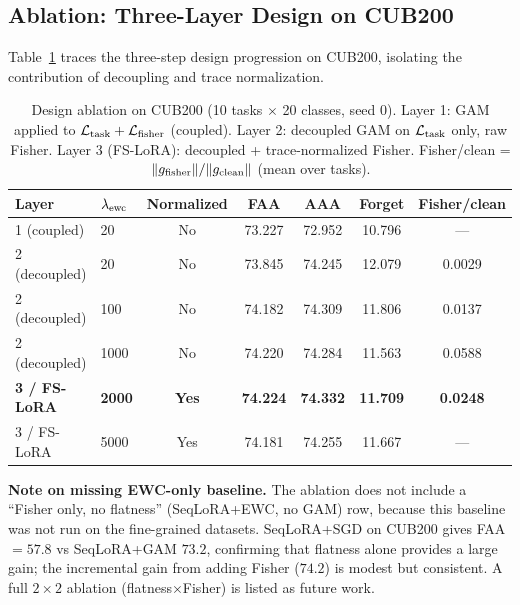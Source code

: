 \subsection{Ablation: Three-Layer Design on CUB200}
\label{sec:ablation}

Table~\ref{tab:ablation} traces the three-step design progression on CUB200,
isolating the contribution of decoupling and trace normalization.

\begin{table}[h]
\caption{Design ablation on CUB200 (10 tasks $\times$ 20 classes, seed 0).
Layer 1: GAM applied to $\mathcal{L}_{\mathrm{task}}+\mathcal{L}_{\mathrm{fisher}}$ (coupled).
Layer 2: decoupled GAM on $\mathcal{L}_{\mathrm{task}}$ only, raw Fisher.
Layer 3 (FS-LoRA): decoupled + trace-normalized Fisher.
Fisher/clean = $\|g_{\mathrm{fisher}}\|/\|g_{\mathrm{clean}}\|$ (mean over tasks).}
\label{tab:ablation}
\centering
\begin{tabular}{llccccc}
\toprule
Layer & $\lambda_{\mathrm{ewc}}$ & Normalized & FAA & AAA & Forget & Fisher/clean \\
\midrule
1 (coupled) & 20   & No  & 73.227 & 72.952 & 10.796 & --- \\
2 (decoupled) & 20   & No  & 73.845 & 74.245 & 12.079 & 0.0029 \\
2 (decoupled) & 100  & No  & 74.182 & 74.309 & 11.806 & 0.0137 \\
2 (decoupled) & 1000 & No  & 74.220 & 74.284 & 11.563 & 0.0588 \\
\midrule
\textbf{3 / FS-LoRA} & \textbf{2000} & \textbf{Yes} & \textbf{74.224} & \textbf{74.332} & \textbf{11.709} & \textbf{0.0248} \\
3 / FS-LoRA & 5000 & Yes & 74.181 & 74.255 & 11.667 & --- \\
\bottomrule
\end{tabular}
\end{table}

\textbf{Note on missing EWC-only baseline.}
The ablation does not include a ``Fisher only, no flatness'' (SeqLoRA+EWC, no GAM) row,
because this baseline was not run on the fine-grained datasets.
SeqLoRA+SGD on CUB200 gives FAA$=57.8$ vs SeqLoRA+GAM $73.2$, confirming that
flatness alone provides a large gain;
the incremental gain from adding Fisher ($74.2$) is modest but consistent.
A full $2\times2$ ablation (flatness$\times$Fisher) is listed as future work.

